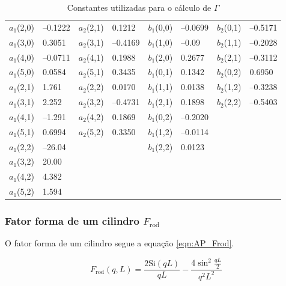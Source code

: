\begin{apendicesenv}
\begin{table}[h]
    \IBGEtab%
    {\caption{Constantes utilizadas para o cálculo de \(\Gamma\)}
    \label{tab_ap:AiBi}}%
    {\begin{tabular}{r l | r l | r l | r l}
    	\toprule
    	\(a_1\)(2,0) & --0.1222 & \(a_2\)(2,1) & 0.1212   & \(b_1\)(0,0) & --0.0699 & \(b_2\)(0,1) & --0.5171 \\
    	\(a_1\)(3,0) & 0.3051   & \(a_2\)(3,1) & --0.4169 & \(b_1\)(1,0) & --0.09   & \(b_2\)(1,1) & --0.2028 \\
    	\(a_1\)(4,0) & --0.0711 & \(a_2\)(4,1) & 0.1988   & \(b_1\)(2,0) & 0.2677   & \(b_2\)(2,1) & --0.3112 \\
    	\(a_1\)(5,0) & 0.0584   & \(a_2\)(5,1) & 0.3435   & \(b_1\)(0,1) & 0.1342   & \(b_2\)(0,2) & 0.6950   \\
    	\(a_1\)(2,1) & 1.761    & \(a_2\)(2,2) & 0.0170   & \(b_1\)(1,1) & 0.0138   & \(b_2\)(1,2) & --0.3238 \\
    	\(a_1\)(3,1) & 2.252    & \(a_2\)(3,2) & --0.4731 & \(b_1\)(2,1) & 0.1898   & \(b_2\)(2,2) & --0.5403 \\
    	\(a_1\)(4,1) & --1.291  & \(a_2\)(4,2) & 0.1869   & \(b_1\)(0,2) & --0.2020 &            &          \\
    	\(a_1\)(5,1) & 0.6994   & \(a_2\)(5,2) & 0.3350   & \(b_1\)(1,2) & --0.0114 &            &          \\
    	\(a_1\)(2,2) & --26.04  &            &          & \(b_1\)(2,2) & 0.0123   &            &          \\
    	\(a_1\)(3,2) & 20.00    &            &          &            &          &            &          \\
    	\(a_1\)(4,2) & 4.382    &            &          &            &          &            &          \\
    	\(a_1\)(5,2) & 1.594    &            &          &            &          &            &          \\ \bottomrule
    \end{tabular} }%
    {}%
\end{table}

\subsubsection{Fator forma de um cilindro \(F_{\mathrm{rod}}\)}

O fator forma de um cilindro segue a equação \ref{eqn:AP_Frod}.

\begin{equation}
F_{\mathrm{rod}}(q, L) = \frac{2\mathrm{Si}(qL)}{qL} - \frac{4\sin^2\frac{qL}{2}}{q^2L^2}
\label{eqn:AP_Frod}
\end{equation}


\end{apendicesenv}
